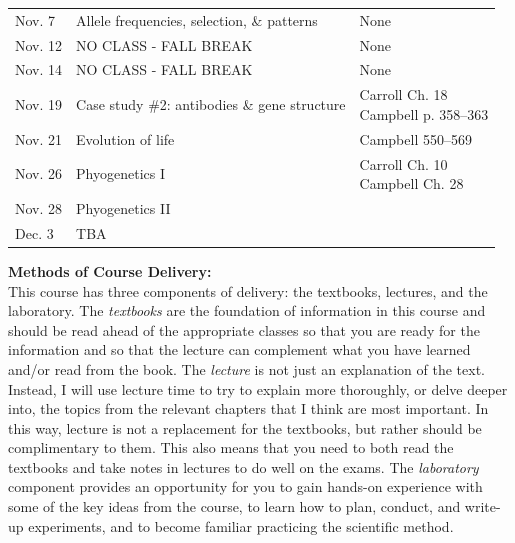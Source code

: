 \documentclass[hidelinks]{article}
\begin{document}
\begin{table}[H]
\begin{tabular}{l p{6cm} p{6cm}}
			\addlinespace
			Nov. 7 & Allele frequencies, selection, \& patterns & None\\
			\addlinespace
			Nov. 12 & NO CLASS - FALL BREAK & None\\
			\addlinespace
			Nov. 14 & NO CLASS - FALL BREAK & None\\
			\addlinespace
			Nov. 19 & Case study \#2: antibodies \& gene structure & \makecell[tl]{Carroll Ch. 18\\ Campbell p. 358--363}\\
			\addlinespace
			Nov. 21 & Evolution of life & Campbell 550--569\\
			\addlinespace
			Nov. 26 & Phyogenetics I & \makecell[tl]{Carroll Ch. 10\\ Campbell Ch. 28}\\
			\addlinespace
			Nov. 28 & Phyogenetics II &\\
			\addlinespace
			Dec. 3 & TBA &\\
			\bottomrule
		\end{tabular}
	\end{table}	


	\newpage
	\textbf{Methods of Course Delivery:}\\
	This course has three components of delivery: the textbooks, lectures, and the laboratory. The \emph{textbooks} are the foundation of information in this course and should be read ahead of the appropriate classes so that you are ready for the information and so that the lecture can complement what you have learned and/or read from the book. The \emph{lecture} is not just an explanation of the text. Instead, I will use lecture time to try to explain more thoroughly, or delve deeper into, the topics from the relevant chapters that I think are most important. In this way, lecture is not a replacement for the textbooks, but rather should be complimentary to them. This also means that you need to both read the textbooks and take notes in lectures to do well on the exams. The \emph{laboratory} component provides an opportunity for you to gain hands-on experience with some of the key ideas from the course, to learn how to plan, conduct, and write-up experiments, and to become familiar practicing the scientific method.\\
	 

\vspace{0.3cm}
\end{document}
